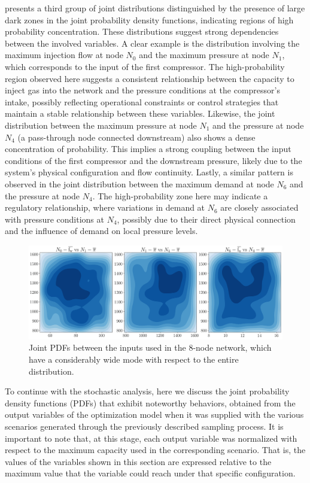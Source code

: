  presents a third group of joint distributions distinguished by the presence of large dark zones in the joint probability density functions, indicating regions of high probability concentration. These distributions suggest strong dependencies between the involved variables. A clear example is the distribution involving the maximum injection flow at node $N_0$ and the maximum pressure at node $N_1$, which corresponds to the input of the first compressor. The high-probability region observed here suggests a consistent relationship between the capacity to inject gas into the network and the pressure conditions at the compressor’s intake, possibly reflecting operational constraints or control strategies that maintain a stable relationship between these variables. Likewise, the joint distribution between the maximum pressure at node $N_1$ and the pressure at node $N_4$ (a pass-through node connected downstream) also shows a dense concentration of probability. This implies a strong coupling between the input conditions of the first compressor and the downstream pressure, likely due to the system’s physical configuration and flow continuity. Lastly, a similar pattern is observed in the joint distribution between the maximum demand at node $N_6$ and the pressure at node $N_4$. The high-probability zone here may indicate a regulatory relationship, where variations in demand at $N_6$ are closely associated with pressure conditions at $N_4$, possibly due to their direct physical connection and the influence of demand on local pressure levels.


\begin{figure}[htbp]
    \centering
    \includegraphics[width=.8\textwidth]{figures/Chapter_NonLinealCensnet/PDF_inputs_inputs_wide_mode.png}
    \caption{Joint PDFs between the inputs used in the 8-node network, which have a considerably wide mode with respect to the entire distribution.}
    \label{fig:joint_distributions_input_input_wide_mode}
\end{figure}


 
To continue with the stochastic analysis, here we discuss the joint probability density functions (PDFs) that exhibit noteworthy behaviors, obtained from the output variables of the optimization model when it was supplied with the various scenarios generated through the previously described sampling process. It is important to note that, at this stage, each output variable was normalized with respect to the maximum capacity used in the corresponding scenario. That is, the values of the variables shown in this section are expressed relative to the maximum value that the variable could reach under that specific configuration.


